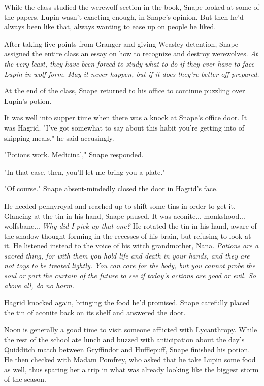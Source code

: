 While the class studied the werewolf section in the book, Snape looked at some of the papers. Lupin wasn't exacting enough, in Snape's opinion. But then he'd always been like that, always wanting to ease up on people he liked.

After taking five points from Granger and giving Weasley detention, Snape assigned the entire class an essay on how to recognize and destroy werewolves. \emph{At the very least, they have been forced to study what to do if they ever have to face Lupin in wolf form. May it never happen, but if it does they're better off prepared.}

At the end of the class, Snape returned to his office to continue puzzling over Lupin's potion.

It was well into supper time when there was a knock at Snape's office door. It was Hagrid. "I've got somewhat to say about this habit you're getting into of skipping meals," he said accusingly.

"Potions work. Medicinal," Snape responded.

"In that case, then, you'll let me bring you a plate."

"Of course." Snape absent-mindedly closed the door in Hagrid's face.

He needed pennyroyal and reached up to shift some tins in order to get it. Glancing at the tin in his hand, Snape paused. It was aconite... monkshood... wolfsbane... \emph{Why did I pick up that one?} He rotated the tin in his hand, aware of the shadow thought forming in the recesses of his brain, but refusing to look at it. He listened instead to the voice of his witch grandmother, Nana. \emph{Potions are a sacred thing, for with them you hold life and death in your hands, and they are not toys to be treated lightly. You can care for the body, but you cannot probe the soul or part the curtain of the future to see if today's actions are good or evil. So above all, do no harm.}

Hagrid knocked again, bringing the food he'd promised. Snape carefully placed the tin of aconite back on its shelf and answered the door.

Noon is generally a good time to visit someone afflicted with Lycanthropy. While the rest of the school ate lunch and buzzed with anticipation about the day's Quidditch match between Gryffindor and Hufflepuff, Snape finished his potion. He then checked with Madam Pomfrey, who asked that he take Lupin some food as well, thus sparing her a trip in what was already looking like the biggest storm of the season.

